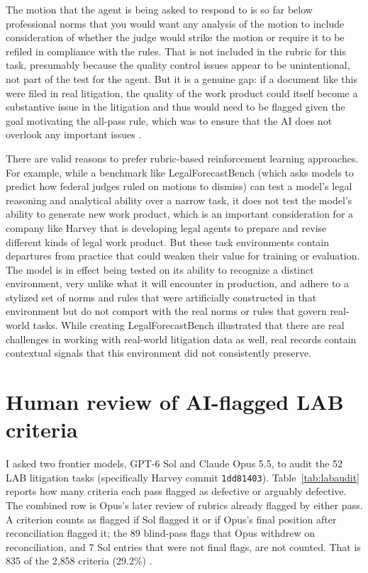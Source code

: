\documentclass[11pt]{article}
\newcommand{\labTasks}{52}
\newcommand{\labCriteria}{2{,}858}
\newcommand{\labFlagged}{835}
\newcommand{\labFlaggedPct}{29.2}
\begin{document}
The motion that the agent is being asked to respond to is so far below professional norms that you would want any analysis of the motion to include consideration of whether the judge would strike the motion or require it to be refiled in compliance with the rules. That is not included in the rubric for this task, presumably because the quality control issues appear to be unintentional, not part of the test for the agent. But it is a genuine gap: if a document like this were filed in real litigation, the quality of the work product could itself become a substantive issue in the litigation and thus would need to be flagged given the goal motivating the all-pass rule, which was to ensure that the AI does not overlook any important issues \citep[section ``Evaluating a task'']{harveyLAB}.

There are valid reasons to prefer rubric-based reinforcement learning approaches. For example, while a benchmark like LegalForecastBench (which asks models to predict how federal judges ruled on motions to dismiss) can test a model's legal reasoning and analytical ability over a narrow task, it does not test the model's ability to generate new work product, which is an important consideration for a company like Harvey that is developing legal agents to prepare and revise different kinds of legal work product. But these task environments contain departures from practice that could weaken their value for training or evaluation. The model is in effect being tested on its ability to recognize a distinct environment, very unlike what it will encounter in production, and adhere to a stylized set of norms and rules that were artificially constructed in that environment but do not comport with the real norms or rules that govern real-world tasks. While creating LegalForecastBench illustrated that there are real challenges in working with real-world litigation data as well, real records contain contextual signals that this environment did not consistently preserve.

\clearpage
\section{Human review of AI-flagged LAB criteria}
\label{app:labreview}
I asked two frontier models, GPT-6 Sol and Claude Opus 5.5, to audit the \labTasks{} LAB litigation tasks (specifically Harvey commit \texttt{1dd81403}). Table~\ref{tab:labaudit} reports how many criteria each pass flagged as defective or arguably defective. The combined row is Opus's later review of rubrics already flagged by either pass. A criterion counts as flagged if Sol flagged it or if Opus's final position after reconciliation flagged it; the 89 blind-pass flags that Opus withdrew on reconciliation, and 7 Sol entries that were not final flags, are not counted. That is \labFlagged{} of the \labCriteria{} criteria (\labFlaggedPct\%) \citep{labaudit}.
\end{document}
